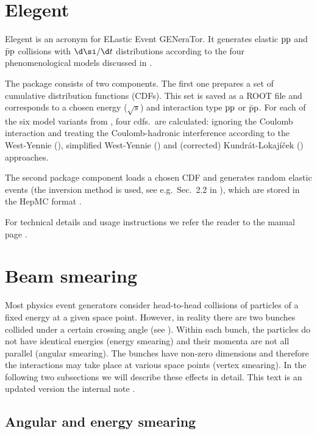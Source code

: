 \section[elegent]{Elegent}

Elegent is an acronym for ELastic Event GENeraTor. It generates elastic $\rm pp$ and $\rm\bar pp$ collisions with $\d\si/\d t$ distributions according to the four phenomenological models discussed in .

The package consists of two components. The first one prepares a set of cumulative distribution functions (CDFs). This set is saved as a ROOT file and corresponds to a chosen energy ($\sqrt s$) and interaction type $\rm pp$ or $\rm \bar pp$. For each of the six model variants from , four cdfs.~are calculated: ignoring the Coulomb interaction and treating the Coulomb-hadronic interference according to the West-Yennie (), simplified West-Yennie () and (corrected) Kundr\' at-Lokaj\' i\v cek () approaches.

The second package component loads a chosen CDF and generates random elastic events (the inversion method is used, see e.g.~Sec.~2.2 in ), which are stored in the HepMC format .

For technical details and usage instructions we refer the reader to the manual page .



\section[beam smearing]{Beam smearing}

Most physics event generators consider head-to-head collisions of particles of a fixed energy at a given space point. However, in reality there are two bunches collided under a certain crossing angle (see ). Within each bunch, the particles do not have identical energies (energy smearing) and their momenta are not all parallel (angular smearing). The bunches have non-zero dimensions and therefore the interactions may take place at various space points (vertex smearing). In the following two subsections we will describe these effects in detail. This text is an updated version the internal note .


\subsection{Angular and energy smearing}

